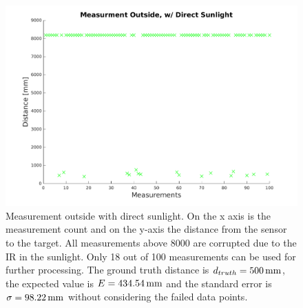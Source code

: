 \begin{figure}
	\centering
	\includegraphics[width=0.9\linewidth]{pictures/plot_meas_out.pdf}
	\caption{Measurement outside with direct sunlight. On the x axis is the measurement count and on the y-axis the distance from the sensor to the target. All measurements above 8000 are corrupted due to the IR in the sunlight. Only 18 out of 100 measurements can be used for further processing. The ground truth distance is $d_{truth}=\unit[500]{mm}$, the expected value is $E=\unit[434.54]{mm}$ and the standard error is $\sigma=\unit[98.22]{mm}$ without considering the failed data points.}
	\label{fig:meas_out_sun}
\end{figure}


